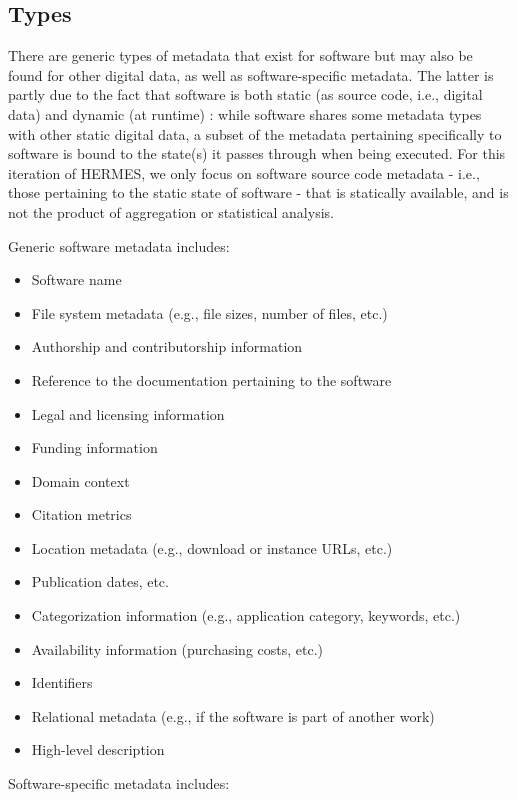 \documentclass{article}
\begin{document}
\subsection{Types}\label{f0r5na7rt7k7c}
There are generic types of metadata that exist for software but may also be found for other digital data, as well as software-specific metadata. The latter is partly due to the fact that software is both static (as source code, i.e., digital data) and dynamic (at runtime) \cite{138880/U87URNI5}: while software shares some metadata types with other static digital data, a subset of the metadata pertaining specifically to software is bound to the state(s) it passes through when being executed. For this iteration of HERMES, we only focus on software source code metadata - i.e., those pertaining to the static state of software - that is statically available, and is not the product of aggregation or statistical analysis.

Generic software metadata includes:

\begin{itemize}  
  \item Software name
  \item File system metadata (e.g., file sizes, number of files, etc.)
  \item Authorship and contributorship information
  \item Reference to the documentation pertaining to the software
  \item Legal and licensing information
  \item Funding information
  \item Domain context
  \item Citation metrics
  \item Location metadata (e.g., download or instance URLs, etc.)
  \item Publication dates, etc.
  \item Categorization information (e.g., application category, keywords, etc.)
  \item Availability information (purchasing costs, etc.)
  \item Identifiers
  \item Relational metadata (e.g., if the software is part of another work)
  \item High-level description
\end{itemize}

Software-specific metadata includes:
\end{document}
